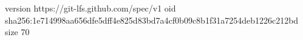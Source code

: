 version https://git-lfs.github.com/spec/v1
oid sha256:1e714998aa656dfe5dff4e825d83bd7a4cf0b09c8b1f31a7254deb1226c212bd
size 70
